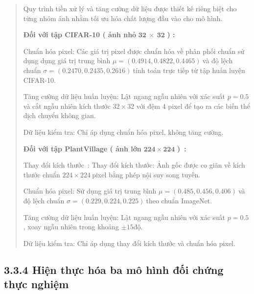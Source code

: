 \documentclass[
  12pt,
  a4paper,
]{report}
\begin{document}
\begin{quote}
Quy trình tiền xử lý và tăng cường dữ liệu được thiết kế riêng biệt cho
từng nhóm ảnh nhằm tối ưu hóa chất lượng đầu vào cho mô hình.

\textbf{Đối với tập CIFAR-10 ( ảnh nhỏ} \(\mathbf{32\  \times \ 32}\)
\textbf{) :}

Chuẩn hóa pixel: Các giá trị pixel được chuẩn hóa về phân phối chuẩn sử
dụng dụng giá trị trung bình \(\mu = (0.4914,0.4822,0.4465)\ \)và độ
lệch chuẩn \(\sigma = (0.2470,0.2435,0.2616)\ \)tính toán trực tiếp từ
tập huấn luyện CIFAR-10.

Tăng cường dữ liệu huấn luyện: Lật ngang ngẫu nhiên với xác suất
\(p = 0.5\ \)và cắt ngẫu nhiên kích thước \(32 \times 32\) với đệm 4
pixel để tạo ra các biến thể dịch chuyển không gian.

Dữ liệu kiểm tra: Chỉ áp dụng chuẩn hóa pixel, không tăng cường.

\textbf{Đối với tập PlantVillage ( ảnh lớn} \(\mathbf{224 \times 224}\)
\textbf{)~:}

Thay đổi kích thước~: Thay đổi kích thước: Ảnh gốc được co giãn về kích
thước chuẩn \(224 \times 224\ \)pixel bằng phép nội suy song tuyến.

Chuẩn hóa pixel: Sử dụng giá trị trung bình
\(\mu = (0.485,0.456,0.406)\ \)và độ lệch chuẩn
\(\sigma = (0.229,0.224,0.225)\ \)theo chuẩn ImageNet.

Tăng cường dữ liệu huấn luyện: Lật ngang ngẫu nhiên với xác suất
\(p = 0.5\), xoay ngẫu nhiên trong khoảng \(\pm 15\)độ.

Dữ liệu kiểm tra: Chỉ áp dụng thay đổi kích thước và chuẩn hóa pixel.
\end{quote}

\subsection*{3.3.4 Hiện thực hóa ba mô hình đối chứng thực
nghiệm}\label{hiux1ec7n-thux1ef1c-huxf3a-ba-muxf4-huxecnh-ux111ux1ed1i-chux1ee9ng-thux1ef1c-nghiux1ec7m}
\end{document}
